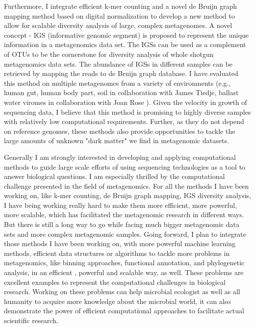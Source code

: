 \documentclass[12pt]{article}
\theoremstyle{plain} \numberwithin{equation}{section}
\theoremstyle{definition}
\begin{document}
Furthermore, I integrate efficient k-mer counting and a novel de Bruijn graph mapping method based on digital normalization 
to develop a new method to allow for scalable diversity analysis of large, complex metagenomes.  A novel concept - 
IGS (informative genomic segment) is proposed to represent the 
unique information in a metagenomics data set. The IGSs can be used as a complement of OTUs to be the cornerstone for 
diversity analysis of whole shotgun metagenomics data sets. The abundance of IGSs in different samples can be 
retrieved by mapping the reads to de Bruijn graph database. I have evaluated this method on multiple metagenomes from 
a variety of environments (e.g., human gut, human body part, soil in collaboration with James Tiedje, ballast water 
viromes in collaboration with Joan Rose ). Given the velocity in growth of sequencing data, I believe that this method is 
promising to highly diverse samples with relatively low computational requirements. Further, as they do not depend on 
reference genomes, these methods also provide opportunities to tackle the large amounts of unknown "dark matter" we 
find in metagenomic datasets.

Generally I am strongly interested in developing and applying computational methods to guide large scale efforts of using 
sequencing technologies as a tool to answer biological questions. I am especially thrilled by the computational challenge 
presented in the field of metagenomics. For all the methods I have been working on, like k-mer counting, de Bruijn graph 
mapping, IGS diversity analysis, I have being working really hard to make them more efficient, more powerful, more scalable, 
which has facilitated the metagenomic research in different ways. But there is still a long way to go while facing much bigger 
metagenomic data sets and more complex metagenomic samples.  Going forward, I plan to integrate those methods I have
 been working on, with more powerful machine learning methods,  efficient data structures or algorithms to tackle more 
 problems in metagenomics, like  binning approaches, functional annotation, and phylogenetic analysis,  in an efficient , 
  powerful and  scalable way, as well.  These problems are excellent examples to represent the computational 
 challenges in biological research. Working on these problems can help microbial ecologist as well as all humanity to acquire 
 more knowledge about the microbial world, it can also demonstrate  the power of efficient computational approaches to 
 facilitate actual scientific research. 



\raisebox{1cm}
\end{document}

